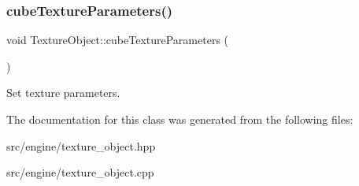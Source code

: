 \subsubsection{\texorpdfstring{cubeTextureParameters()}{cubeTextureParameters()}}
{\footnotesize\ttfamily void Texture\+Object\+::cube\+Texture\+Parameters (\begin{DoxyParamCaption}{ }\end{DoxyParamCaption})\hspace{0.3cm}{\ttfamily [protected]}}



Set texture parameters. 



The documentation for this class was generated from the following files\+:\begin{DoxyCompactItemize}
\item 
src/engine/texture\+\_\+object.\+hpp\item 
src/engine/texture\+\_\+object.\+cpp\end{DoxyCompactItemize}
